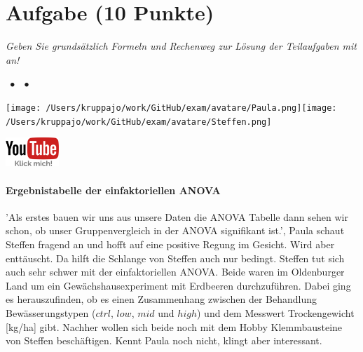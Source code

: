 \documentclass[a4paper, 9pt]{scrartcl}\usepackage[]{graphicx}\usepackage[]{xcolor}
\begin{document}
\clearpage

\section{Aufgabe \hfill (10 Punkte)}

\textit{Geben Sie grundsätzlich Formeln und Rechenweg zur Lösung der Teilaufgaben mit an!} \\[1Ex]
 

 
\ifcollection
\begin{flushright}
\tiny\vspace{-3Ex}
\textbf{\examinhaltstart}
\exammodulemathstat $\;\bullet$
\exammodulestat $\;\bullet$
\exammodulestatbbv 
\vspace{-4Ex}
\end{flushright}
\begin{minipage}[t]{0.5\textwidth}
\texttt{[image: /Users/kruppajo/work/GitHub/exam/avatare/Paula.png]}\hspace{-4mm}\texttt{[image: /Users/kruppajo/work/GitHub/exam/avatare/Steffen.png]}
\end{minipage}
\begin{minipage}[t]{0.5\textwidth}
\hfill
\href{https://youtu.be/25bvWshX-Gw}{\includegraphics[width = 2cm]{img/youtube}}
\end{minipage}
\fi



\ifcollection
\paragraph{Ergebnistabelle der einfaktoriellen ANOVA}
\fi

'Als erstes bauen wir uns aus unsere Daten die ANOVA Tabelle dann sehen wir schon, ob unser Gruppenvergleich in der ANOVA signifikant ist.', Paula schaut Steffen fragend an und hofft auf eine positive Regung im Gesicht. Wird aber enttäuscht. Da hilft die Schlange von Steffen auch nur bedingt. Steffen tut sich auch sehr schwer mit der einfaktoriellen ANOVA. Beide waren im Oldenburger Land um ein Gewächshausexperiment mit Erdbeeren durchzuführen. Dabei ging es herauszufinden, ob es einen Zusammenhang zwischen der Behandlung Bewässerungstypen ($ctrl$, $low$, $mid$ und $high$) und dem Messwert Trockengewicht [kg/ha] gibt. Nachher wollen sich beide noch mit dem Hobby Klemmbausteine von Steffen beschäftigen. Kennt Paula noch nicht, klingt aber interessant.
\end{document}
